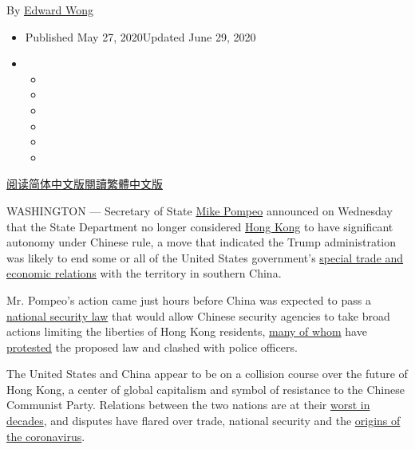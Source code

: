 By \href{https://www.nytimes3xbfgragh.onion/by/edward-wong}{Edward Wong}

\begin{itemize}
\item
  Published May 27, 2020Updated June 29, 2020
\item
  \begin{itemize}
  \item
  \item
  \item
  \item
  \item
  \item
  \end{itemize}
\end{itemize}

\href{https://cn.nytimes3xbfgragh.onion/usa/20200528/china-hong-kong-pompeo-trade/}{阅读简体中文版}\href{https://cn.nytimes3xbfgragh.onion/usa/20200528/china-hong-kong-pompeo-trade/zh}{閱讀繁體中文版}

WASHINGTON --- Secretary of State
\href{https://www.nytimes3xbfgragh.onion/2020/06/23/us/politics/pompeo-state-human-rights.html}{Mike
Pompeo} announced on Wednesday that the State Department no longer
considered
\href{https://www.nytimes3xbfgragh.onion/2020/06/29/business/economy/us-halts-high-tech-exports-hong-kong.html}{Hong
Kong} to have significant autonomy under Chinese rule, a move that
indicated the Trump administration was likely to end some or all of the
United States government's
\href{https://www.nytimes3xbfgragh.onion/2020/05/28/business/hong-kong-special-status-explained.html}{special
trade and economic relations} with the territory in southern China.

Mr. Pompeo's action came just hours before China was expected to pass a
\href{https://www.nytimes3xbfgragh.onion/2020/06/19/world/asia/hong-kong-china-national-security.html}{national
security law} that would allow Chinese security agencies to take broad
actions limiting the liberties of Hong Kong residents,
\href{https://www.nytimes3xbfgragh.onion/2020/05/27/world/asia/hong-kong-protest-china-anthem.html?action=click\&module=Top\%20Stories\&pgtype=Homepage}{many
of whom} have
\href{https://www.nytimes3xbfgragh.onion/2020/05/24/world/asia/hong-kong-protest-coronavirus-china.html}{protested}
the proposed law and clashed with police officers.

The United States and China appear to be on a collision course over the
future of Hong Kong, a center of global capitalism and symbol of
resistance to the Chinese Communist Party. Relations between the two
nations are at their
\href{https://www.nytimes3xbfgragh.onion/2020/05/28/world/asia/china-united-states.html}{worst
in decades}, and disputes have flared over trade, national security and
the
\href{https://www.nytimes3xbfgragh.onion/2020/04/30/us/politics/trump-administration-intelligence-coronavirus-china.html}{origins
of the coronavirus}.

